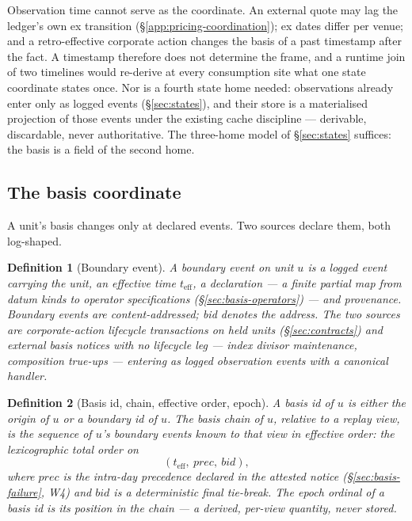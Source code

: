 \documentclass[11pt,a4paper]{article}
\newtheorem{definition}{Definition}[section]
\begin{document}
Observation time cannot serve as the coordinate. An external quote may lag the ledger's
own ex transition (\S\ref{app:pricing-coordination}); ex dates differ per venue; and a retro-effective
corporate action changes the basis of a past timestamp after the fact. A timestamp
therefore does not determine the frame, and a runtime join of two timelines would
re-derive at every consumption site what one state coordinate states once. Nor is a
fourth state home needed: observations already enter only as logged events
(\S\ref{sec:states}), and their store is a materialised projection of those events under
the existing cache discipline --- derivable, discardable, never authoritative. The
three-home model of \S\ref{sec:states} suffices: the basis is a field of the second
home.

\subsection{The basis coordinate}
\label{sec:basis-coordinate}

A unit's basis changes only at declared events. Two sources declare them, both
log-shaped.

\begin{definition}[Boundary event]
\label{def:boundary-event}
A \emph{boundary event} on unit $u$ is a logged event carrying the unit, an effective
time $t_{\mathrm{eff}}$, a \emph{declaration} --- a finite partial map from datum kinds
to operator specifications (\S\ref{sec:basis-operators}) --- and provenance. Boundary
events are content-addressed; \emph{bid} denotes the address. The two sources are
corporate-action lifecycle transactions on held units (\S\ref{sec:contracts}) and
external basis notices with no lifecycle leg --- index divisor maintenance, composition
true-ups --- entering as logged observation events with a canonical handler.
\end{definition}

\begin{definition}[Basis id, chain, effective order, epoch]
\label{def:basis-id}
A \emph{basis id} of $u$ is either the origin of $u$ or a boundary id
of $u$. The \emph{basis chain} of $u$, relative to a replay view, is the sequence of
$u$'s boundary events known to that view in \emph{effective order}: the lexicographic
total order on
\[
(t_{\mathrm{eff}},\ \mathit{prec},\ \mathit{bid}),
\]
where $\mathit{prec}$ is the intra-day precedence declared in the attested notice
(\S\ref{sec:basis-failure}, W4) and $\mathit{bid}$ is a deterministic final tie-break.
The \emph{epoch ordinal} of a basis id is its position in the chain --- a derived,
per-view quantity, never stored.
\end{definition}
\end{document}
